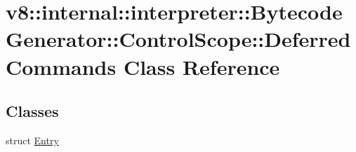 \hypertarget{classv8_1_1internal_1_1interpreter_1_1_bytecode_generator_1_1_control_scope_1_1_deferred_commands}{}\section{v8\+:\+:internal\+:\+:interpreter\+:\+:Bytecode\+Generator\+:\+:Control\+Scope\+:\+:Deferred\+Commands Class Reference}
\label{classv8_1_1internal_1_1interpreter_1_1_bytecode_generator_1_1_control_scope_1_1_deferred_commands}
\subsection*{Classes}
\begin{DoxyCompactItemize}
\item 
struct \hyperlink{structv8_1_1internal_1_1interpreter_1_1_bytecode_generator_1_1_control_scope_1_1_deferred_commands_1_1_entry}{Entry}
\end{DoxyCompactItemize}
